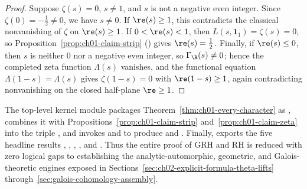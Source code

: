 \begin{proof}
Suppose $\zeta(s) = 0$, $s \neq 1$, and $s$ is not a negative even integer.
Since $\zeta(0) = -\tfrac{1}{2} \neq 0$, we have $s \neq 0$.
If $\re(s) \ge 1$, this contradicts the classical nonvanishing of $\zeta$ on
$\re(s) \ge 1$.
If $0 < \re(s) < 1$, then $L(s, \mathbf{1}_1) = \zeta(s) = 0$, so
Proposition~\ref{prop:ch01-claim-strip} () gives
$\re(s) = \tfrac{1}{2}$.
Finally, if $\re(s) \le 0$, then $s$ is neither $0$ nor a negative even
integer, so $\Gamma_{\R}(s) \neq 0$; hence the completed zeta function
$\Lambda(s)$ vanishes, and the functional equation $\Lambda(1 - s) = \Lambda(s)$
gives $\zeta(1 - s) = 0$ with $\re(1 - s) \ge 1$, again contradicting
nonvanishing on the closed half-plane $\re \ge 1$.
\end{proof}

The top-level kernel module  packages
Theorem~\ref{thm:ch01-every-character} as , combines it with
Propositions~\ref{prop:ch01-claim-strip} and~\ref{prop:ch01-claim-zeta} into
the triple , and invokes 
and  to produce  and
.
Finally,  exports the five headline results
, ,
, ,
and .
Thus the entire proof of GRH and RH is reduced with zero logical gaps to
establishing the analytic-automorphic, geometric, and Galois-theoretic engines
exposed in Sections~\ref{sec:ch02-explicit-formula-theta-lifts}
through~\ref{sec:galois-cohomology-assembly}.
